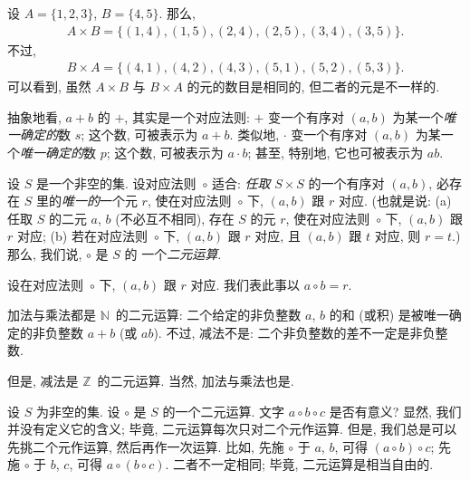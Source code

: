 \begin{example}
    设 \(A = \{ 1, 2, 3\}\),
    \(B = \{4, 5\}\).
    那么,
    \begin{align*}
        A \times B
        = \{ (1,4),(1,5),(2,4),(2,5),(3,4),(3,5) \}.
    \end{align*}
    不过,
    \begin{align*}
        B \times A
        = \{ (4,1),(4,2),(4,3),(5,1),(5,2),(5,3) \}.
    \end{align*}
    可以看到, 虽然 \(A \times B\) 与 \(B \times A\)
    的元的数目是相同的,
    但二者的元是不一样的.
\end{example}

抽象地看, \(a + b\) 的 \(+\),
其实是一个对应法则:
\(+\) 变一个有序对 \((a, b)\)
为某一个\emph{唯一确定的}数 \(s\);
这个数, 可被表示为 \(a + b\).
类似地, \(\cdot\) 变一个有序对 \((a, b)\)
为某一个\emph{唯一确定的}数 \(p\);
这个数, 可被表示为 \(a \cdot b\);
甚至, 特别地, 它也可被表示为 \(ab\).

\begin{definition}
    设 \(S\) 是一个非空的集.
    设对应法则~\(\circ\) 适合:
    \emph{任取} \(S \times S\)
    的一个有序对 \((a, b)\),
    必存在 \(S\) 里的\emph{唯一的}一个元 \(r\),
    使在对应法则~\(\circ\) 下,
    \((a, b)\) 跟 \(r\) 对应.
    (也就是说:
    (a)
    任取 \(S\) 的二元 \(a\), \(b\)
    (不必互不相同),
    存在 \(S\) 的元 \(r\),
    使在对应法则~\(\circ\) 下,
    \((a, b)\) 跟 \(r\) 对应;
    (b)
    若在对应法则~\(\circ\) 下,
    \((a, b)\) 跟 \(r\) 对应,
    且 \((a, b)\) 跟 \(t\) 对应,
    则 \(r = t\).)
    那么, 我们说, \(\circ\) 是 \(S\) 的%
    一个\emph{二元运算}.

    设在对应法则~\(\circ\) 下,
    \((a, b)\) 跟 \(r\) 对应.
    我们表此事以 \(a \circ b = r\).
\end{definition}

\begin{example}
    加法与乘法都是 \(\mathbb{N}\)~的二元运算:
    二个给定的非负整数 \(a\), \(b\)
    的和 (或积) 是被唯一确定的非负整数
    \(a + b\)
    (或 \(ab\)).
    不过, 减法不是:
    二个非负整数的差不一定是非负整数.

    但是, 减法是 \(\mathbb{Z}\)~的二元运算.
    当然, 加法与乘法也是.
\end{example}

设 \(S\) 为非空的集.
设 \(\circ\) 是 \(S\) 的一个二元运算.
文字 \(a \circ b \circ c\) 是否有意义?
显然, 我们并没有定义它的含义;
毕竟, 二元运算每次只对二个元作运算.
但是, 我们总是可以先挑二个元作运算,
然后再作一次运算.
比如, 先施 \(\circ\) 于 \(a\), \(b\),
可得 \((a \circ b) \circ c\);
先施 \(\circ\) 于 \(b\), \(c\),
可得 \(a \circ (b \circ c)\).
二者不一定相同;
毕竟, 二元运算是相当自由的.

